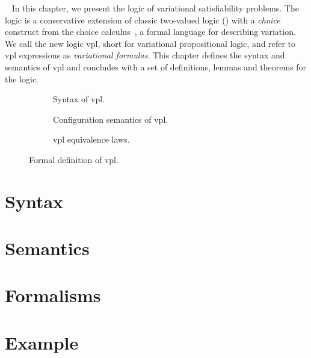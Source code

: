 ~\label{chapter:vpl}
%
In this chapter, we present the logic of variational satisfiability problems.
%
The logic is a conservative extension of classic two-valued logic (\pl{})
with a \emph{choice} construct from the choice
calculus~\cite{EW11tosem,Walk13thesis}, a formal language for describing
variation. We call the new logic \acs{vpl}, short for variational propositional
logic, and refer to \ac{vpl} expressions as \emph{variational formulas}.
%
This chapter defines the syntax and semantics of \ac{vpl} and concludes with a
set of definitions, lemmas and theorems for the logic.
%
\begin{figure}
  \begin{subfigure}[t]{\linewidth}
    \centering
    
    \caption{Syntax of \ac{vpl}.}%
    \label{fig:cc:stx}
  \end{subfigure}
%
  \begin{subfigure}[t]{\linewidth}
    
    \centering
    \caption{Configuration semantics of \ac{vpl}.}%
    \label{fig:cc:cfg}
  \end{subfigure}
%
  \begin{subfigure}[t]{\linewidth}
    
    \centering
    \caption{\ac{vpl} equivalence laws.}%
    \label{fig:cc:eqv}
  \end{subfigure}
\caption{Formal definition of \ac{vpl}.}%
\label{fig:cc}
\end{figure}
%
%
\section{Syntax}

%
\section{Semantics}

%
\section{Formalisms}

%
\section{Example}


